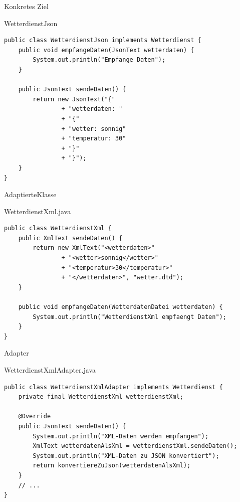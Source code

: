 \begin{frame}[fragile]{Konkretes Ziel}
	\begin{exampleblock}{WetterdienstJson}
        \begin{lstlisting}
public class WetterdienstJson implements Wetterdienst { 
	public void empfangeDaten(JsonText wetterdaten) {
		System.out.println("Empfange Daten");
	}

	public JsonText sendeDaten() {
		return new JsonText("{"
				+ "wetterdaten: "
				+ "{"
				+ "wetter: sonnig"
				+ "temperatur: 30"
				+ "}"
				+ "}");
	}
}
        \end{lstlisting}
 	\end{exampleblock}
\end{frame}

\begin{frame}[fragile]{AdaptierteKlasse}
	\begin{exampleblock}{WetterdienstXml.java}
 		\begin{lstlisting}
public class WetterdienstXml {
	public XmlText sendeDaten() {
		return new XmlText("<wetterdaten>"
				+ "<wetter>sonnig</wetter>"
				+ "<temperatur>30</temperatur>"
				+ "</wetterdaten>", "wetter.dtd");
	}

	public void empfangeDaten(WetterdatenDatei wetterdaten) {
		System.out.println("WetterdienstXml empfaengt Daten");
	}
} 		    
 		\end{lstlisting}
 	\end{exampleblock}
\end{frame}

\begin{frame}[fragile]{Adapter}
	\begin{exampleblock}{WetterdienstXmlAdapter.java}
 		\begin{lstlisting}
public class WetterdienstXmlAdapter implements Wetterdienst {
	private final WetterdienstXml wetterdienstXml;
	
	@Override
	public JsonText sendeDaten() {
		System.out.println("XML-Daten werden empfangen");
		XmlText wetterdatenAlsXml = wetterdienstXml.sendeDaten();
		System.out.println("XML-Daten zu JSON konvertiert");
		return konvertiereZuJson(wetterdatenAlsXml);
	}
    // ...
} 		    
 		\end{lstlisting}
 	\end{exampleblock}
\end{frame}


